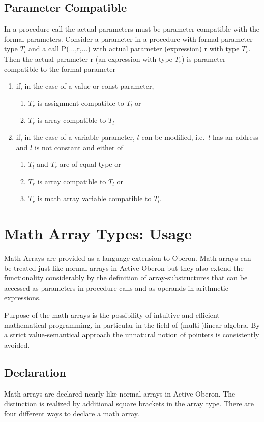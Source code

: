 \documentclass[a4wide,11pt]{article}
\begin{document}
\subsection{Parameter Compatible}\label{subsection: Parameter Compatible}
In a procedure call the actual parameters must be parameter compatible with the formal parameters.
Consider a parameter in a procedure with formal parameter type $T_l$ and a call P(...,r,...) with actual parameter (expression) r with type $T_r$.
Then the actual parameter r (an expression with type $T_r$) is parameter compatible to the formal parameter
\begin{enumerate}
\item if, in the case of a value or const parameter,
\begin{enumerate}
\item $T_r$ is assignment compatible to $T_l$ or
\item $T_r$ is array compatible to $T_l$
\end{enumerate}
\item if, in the case of a variable parameter, $l$ can be modified, i.e.\ $l$ has an address and $l$ is not constant and either of
\begin{enumerate}
\item $T_l$ and $T_r$ are of equal type or
\item $T_r$ is array compatible to $T_l$ or
\item $T_r$ is math array variable compatible to $T_l$.
\end{enumerate}
\end{enumerate}



\appendix\newpage
\section{Math Array Types: Usage}
Math Arrays are provided as a language extension to Oberon.
Math arrays can be treated just like normal arrays in Active Oberon but they also extend the functionality considerably by the definition of array-substructures that can be accessed as parameters in procedure calls and as operands in arithmetic expressions.

Purpose of the math arrays is the possibility of intuitive and efficient mathematical programming, in particular in the field of (multi-)linear algebra.
By a strict value-semantical approach the unnatural notion of pointers is consistently avoided.

\subsection{Declaration}
Math arrays are declared nearly like normal arrays in Active Oberon.
The distinction is realized by additional square brackets in the array type.
There are four different ways to declare a math array.
\end{document}
